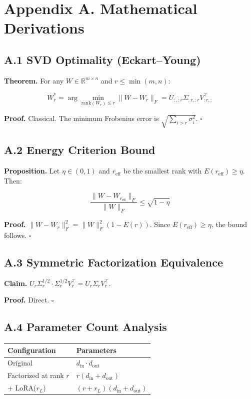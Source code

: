 
\section{Appendix A. Mathematical Derivations}

\subsection{A.1 SVD Optimality (Eckart--Young)}

\textbf{Theorem.} For any $W \in \mathbb{R}^{m \times n}$ and $r \leq \min(m, n)$:

\[
W_r^* = \arg\min_{\text{rank}(W_r) \leq r} \|W - W_r\|_F = U_{:, :r} \Sigma_{:r, :r} V_{:r, :}^\top
\tag{A.1}
\]

\textbf{Proof.} Classical. The minimum Frobenius error is $\sqrt{\sum_{i > r} \sigma_i^2}$. 
$\square$

\subsection{A.2 Energy Criterion Bound}

\textbf{Proposition.} Let $\eta \in (0, 1)$ and $r_\text{eff}$ be the smallest 
rank with $E(r_\text{eff}) \geq \eta$. Then:

\[
\frac{\|W - W_{r_\text{eff}}\|_F}{\|W\|_F} \leq \sqrt{1 - \eta}
\tag{A.2}
\]

\textbf{Proof.} $\|W - W_r\|_F^2 = \|W\|_F^2 (1 - E(r))$. Since $E(r_\text{eff}) \geq \eta$, 
the bound follows. $\square$

\subsection{A.3 Symmetric Factorization Equivalence}

\textbf{Claim.} $U_r \Sigma_r^{1/2} \cdot \Sigma_r^{1/2} V_r^\top = U_r \Sigma_r V_r^\top$.

\textbf{Proof.} Direct. $\square$

\subsection{A.4 Parameter Count Analysis}

\begin{table}[H]
\centering
\small
\begin{tabular}{ll}
\toprule
\textbf{Configuration} & \textbf{Parameters} \\
\midrule
Original & $d_\text{in} \cdot d_\text{out}$ \\
Factorized at rank $r$ & $r(d_\text{in} + d_\text{out})$ \\
+ LoRA($r_L$) & $(r + r_L)(d_\text{in} + d_\text{out})$ \\
\bottomrule
\end{tabular}
\end{table}

